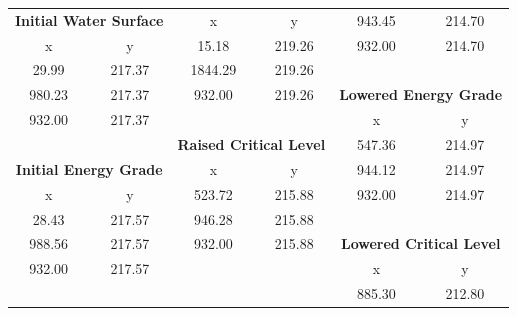 \begin{center}
\begin{tabular}{|cc|cc|cc|}
    \cline{3-4}
    \multicolumn{2}{|c|}{\textbf{Initial Water Surface }}    & x       & y                                          & 943.45  & 214.70                                             \\ 
    \cline{1-2}
    x      & y                                               & 15.18   & 219.26                                     & 932.00  & 214.70                                             \\
    29.99  & 217.37                                          & 1844.29 & 219.26                                     &         &                                                    \\
    980.23 & 217.37                                          & 932.00  & 219.26                                     & \multicolumn{2}{c|}{\textbf{Lowered Energy Grade }}          \\ 
    \cline{5-6}
    932.00 & 217.37                                          &         &                                            & x       & y                                                  \\
           &                                                 & \multicolumn{2}{c|}{\textbf{Raised Critical Level }} & 547.36  & 214.97                                             \\ 
    \cline{3-4}
    \multicolumn{2}{|c|}{\textbf{Initial Energy Grade }}     & x       & y                                          & 944.12  & 214.97                                             \\ 
    \cline{1-2}
    x      & y                                               & 523.72  & 215.88                                     & 932.00  & 214.97                                             \\
    28.43  & 217.57                                          & 946.28  & 215.88                                     &         &                                                    \\
    988.56 & 217.57                                          & 932.00  & 215.88                                     & \multicolumn{2}{c|}{\textbf{Lowered Critical Level }}        \\ 
    \cline{5-6}
    932.00 & 217.57                                          &         &                                            & x       & y                                                  \\
           &                                                 &         &                                            & 885.30  & 212.80                                             \\

\end{tabular}
\end{center}
